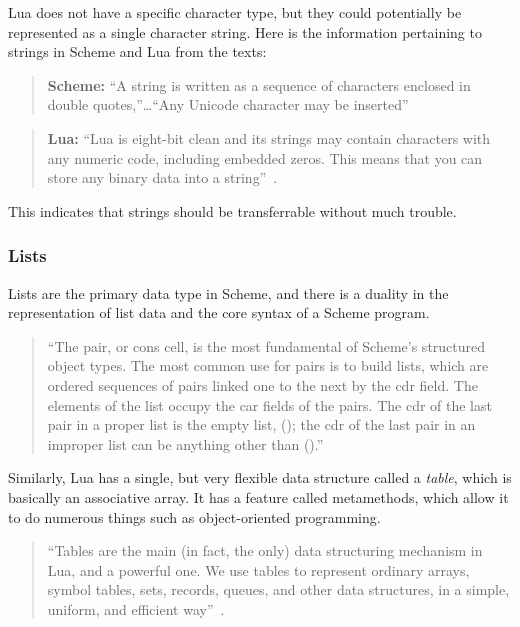 Lua does not have a specific character type, but they could potentially be
represented as a single character string. Here is the information pertaining to
strings in Scheme and Lua from the texts:

\begin{quote}\textbf{Scheme:}
``A string is written as a sequence of characters enclosed in double
quotes,''\ldots ``Any Unicode character may be inserted''~\cite[Sec~6.8]{tspl}
\end{quote}

\begin{quote}\textbf{Lua:}
``Lua is eight-bit clean and its strings may contain characters with any numeric
code, including embedded zeros. This means that you can store any binary data
into a string''~\cite[p.11]{luabook}.
\end{quote}

This indicates that strings should be transferrable without much trouble.

\subsubsection{Lists}

Lists are the primary data type in Scheme, and there is a duality in the
representation of list data and the core syntax of a Scheme program.

\begin{quote}
``The pair, or cons cell, is the most fundamental of Scheme's structured object
types. The most common use for pairs is to build lists, which are ordered
sequences of pairs linked one to the next by the cdr field. The elements of the
list occupy the car fields of the pairs. The cdr of the last pair in a proper
list is the empty list, (); the cdr of the last pair in an improper list can be
anything other than ().''~\cite[Sec~6.4]{tspl}
\end{quote}


Similarly, Lua has a single, but very flexible data structure called a
\emph{table}, which is basically an associative array. It has a feature called
metamethods, which allow it to do numerous things such as object-oriented
programming.
\begin{quote}
``Tables are the main (in fact, the only) data structuring mechanism in Lua, and
a powerful one. We use tables to represent ordinary arrays, symbol tables, sets,
records, queues, and other data structures, in a simple, uniform, and efficient
way''~\cite[p.14]{luabook}.
\end{quote}

